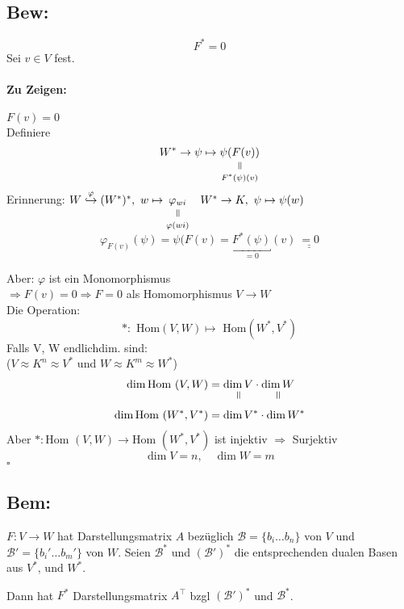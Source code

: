 \documentclass[titlepage,12pt,a4paper,ngerman]{report}
\newenvironment{bew}[1]{\subsection{Bew: #1}}{\hfill$\square$}
\newcommand{\Bew}[2]{\begin{bew}{#1}#2\end{bew}}
\newcommand{\verteq}{\rotatebox{90}{$\,=$}}
\newcommand{\equalto}[2]{\underset{\scriptstyle\overset{\mkern4mu\verteq}{#2}}{#1}}
\newcommand{\tx}[1]{\textrm{#1}}
\begin{document}
\Bew{}{
$$F^* = 0$$
Sei $v \in V$ fest. \\
\paragraph{Zu Zeigen:} 
$F (v) = 0$ \\[10pt]
Definiere $$W^* \to \psi \mapsto \equalto{\psi (F(v))}{F^* (\psi)(v)}$$ 
Erinnerung: $W \buildrel \varphi \over \hookrightarrow (W^*)^* , \ w \mapsto \equalto{\varphi_{wi}}{\varphi(wi)} \quad W^* \to K, \ \psi \mapsto \psi(w)$
$$\varphi_{F(v)} (\psi) = \psi (F(v) = \underbracket{F^* (\psi)}_{=0} (v) \ \underline{\underline{= 0}}$$


Aber: $ \varphi $ ist ein Monomorphismus\\
$ \Rightarrow F(v) = 0 \Rightarrow  F = 0 $ als Homomorphismus $ V\to W $\\
Die Operation:
$$ * : \tx{ Hom}(V,W) \mapsto \tx{ Hom}(W^*,V^*)$$
Falls V, W endlichdim. sind:\\
($ V \approx K^n \approx V^*  $ und $ W \approx K^m \approx W^* $)\\

\begin{align*}
\dim \tx{Hom }(V,W) &= \equalto{\dim V}{} \cdot \equalto{\dim W}{}\\
\dim \tx{Hom }(W^*,V^*) &= \dim V^* \cdot \dim W^*
\end{align*} 
Aber $*: \tx{Hom }(V,W) \to \tx{Hom }(W^*, V^*)$ ist injektiv $\Rightarrow$ Surjektiv
$$\dim V = n, \quad \dim W = m$$
}
\subsection*{Bem:}
$F: V \to W$ hat Darstellungsmatrix $A$ bezüglich $\mathcal B = \{b_i \dots b_n\}$ von $V$ und $\mathcal B' = \{b_i' \dots b_m'\}$ von $W$. Seien $\mathcal B^*$ und $(\mathcal B')^*$ die entsprechenden dualen Basen aus $V^* \tx{, und } W^*$.


Dann hat $ F^* $ Darstellungsmatrix $ A^\top $ bzgl $ (\mathcal{B}')^* $ und $ \mathcal{B}^* $.
\end{document}

